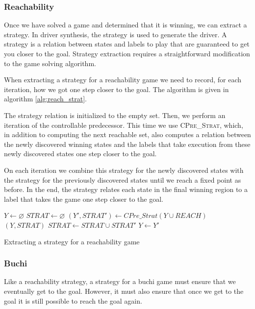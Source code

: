 \documentclass[a4paper,twoside,openright,11pt]{book}
\theoremstyle{definition}
\begin{document}
\subsubsection{Reachability}

Once we have solved a game and determined that it is winning, we can extract a strategy. In driver synthesis, the strategy is used to generate the driver. A strategy is a relation between states and labels to play that are guaranteed to get you closer to the goal. Strategy extraction requires a straightforward modification to the game solving algorithm.

When extracting a strategy for a reachability game we need to record, for each iteration, how we got one step closer to the goal. The algorithm is given in algorithm \ref{alg:reach_strat}. 

The strategy relation is initialized to the empty set. Then, we perform an iteration of the controllable predecessor. This time we use \textsc{CPre\_Strat}, which, in addition to computing the next reachable set, also computes a relation between the newly discovered winning states and the labels that take execution from these newly discovered states one step closer to the goal.

On each iteration we combine this strategy for the newly discovered states with the strategy for the previously discovered states until we reach a fixed point as before. In the end, the strategy relates each state in the final winning region to a label that takes the game one step closer to the goal.

\begin{algorithm}[t]
\begin{algorithmic}
\State $Y \gets \varnothing$
\State $STRAT \gets \varnothing$
\Loop
\State $(Y', STRAT') \gets CPre\_Strat(Y \cup REACH)$
\State\Return $(Y, STRAT)$\EndIf
\State $STRAT \gets STRAT \cup STRAT'$
\State $Y \gets Y'$
\EndLoop
\EndFunction
\end{algorithmic}
\caption{Extracting a strategy for a reachability game}
\label{alg:reach_strat}
\end{algorithm}

\subsubsection{Buchi}

Like a reachability strategy, a strategy for a buchi game must ensure that we eventually get to the goal. However, it must also ensure that once we get to the goal it is still possible to reach the goal again. 
\end{document}
